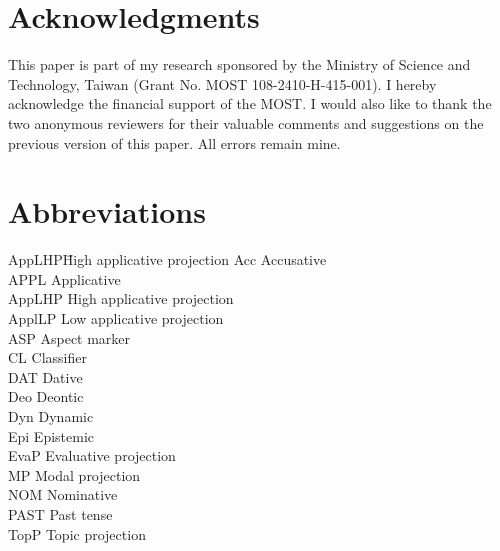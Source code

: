 \documentclass[output=paper,colorlinks,citecolor=brown]{langscibook}
\begin{document}
\section*{Acknowledgments}
This paper is part of my research sponsored by the Ministry of Science and Technology, Taiwan (Grant No. MOST 108-2410-H-415-001). I hereby acknowledge the financial support of the MOST. I would also like to thank the two anonymous reviewers for their valuable comments and suggestions on the previous version of this paper. All errors remain mine.


\section*{Abbreviations}
\begin{multicols}{2}
\begin{tabbing}
AppLHP\hspace{1ex}\=High applicative projection\kill
Acc \> Accusative\\ 
APPL \> Applicative\\ 
AppLHP \> High applicative projection\\ 
ApplLP \> Low applicative projection\\
ASP \> Aspect marker\\ 
CL \> Classifier\\
DAT \> Dative\\
Deo \> Deontic\\
Dyn \> Dynamic\\ 
Epi \> Epistemic\\
EvaP \> Evaluative projection\\ 
MP \> Modal projection\\ 
NOM \> Nominative\\ 
PAST \> Past tense\\ 
TopP \> Topic projection
\end{tabbing}
\end{multicols}

{\sloppy\printbibliography[heading=subbibliography,notkeyword=this]}
\end{document}
